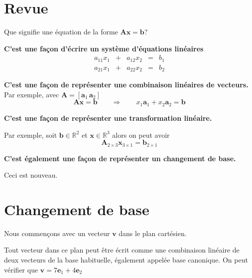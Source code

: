\documentclass{article}
\begin{document}
\section*{Revue}

Que signifie une équation de la forme $\mathbf{A}\mathbf{x} = \mathbf{b}$?
\vfill

\noindent\textbf{ C'est une façon d'écrire un système d'équations linéaires}
\[
\begin{matrix}
a_{11} x_1 &+& a_{12} x_2 &=& b_1 \\
a_{21} x_1 &+& a_{22} x_2 &=& b_2 
\end{matrix}
\]
\vfill

\noindent\textbf{ C'est une façon de représenter
une combinaison linéaires de vecteurs.}
Par exemple, avec $\mathbf{A} = [\mathbf{a}_1 \, \mathbf{a}_2]$
\[
 \mathbf{A}\mathbf{x} = \mathbf{b} \qquad\Rightarrow
\qquad
x_1 \mathbf{a}_1 + x_2 \mathbf{a}_2 = \mathbf{b} 
\]
\vfill

\noindent\textbf{ C'est une façon de représenter
une transformation linéaire.}
\bigskip

Par exemple, soit $\mathbf{b}\in \mathbb{R}^2$ et
$\mathbf{x}\in \mathbb{R}^3$ alors on peut avoir
\[
\mathbf{A}_{2 \times 3} \mathbf{x}_{3\times 1} =
\mathbf{b}_{2\times 1}
\]
\vfill

\noindent\textbf{ C'est également une façon
de représenter un changement de base.}
\bigskip

Ceci est nouveau.
\vfill

\newpage

\section*{Changement de base}
Nous commençons avec un vecteur $\mathbf{v}$ dans
le plan cartésien. 


Tout vecteur dans ce plan
peut être écrit comme une combinaison linéaire
de deux vecteurs de la base habituelle, également appelée base canonique.
On peut vérifier que $\mathbf{v} = 7\mathbf{e}_1
+ 4 \mathbf{e}_2$
\end{document}
